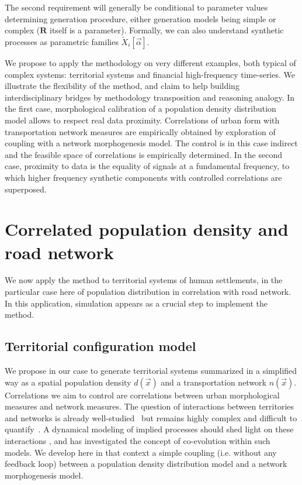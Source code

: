 \documentclass{article}
\begin{document}
The second requirement will generally be conditional to parameter values determining generation procedure, either generation models being simple or complex ($\mathbf{R}$ itself is a parameter). Formally,  we can also understand synthetic processes as parametric families $\tilde{X}_i[\vec{\alpha}]$.

We propose to apply the methodology on very different examples, both typical of complex systems: territorial systems and financial high-frequency time-series. We illustrate the flexibility of the method, and claim to help building interdisciplinary bridges by methodology transposition and reasoning analogy. In the first case, morphological calibration of a population density distribution model allows to respect real data proximity. Correlations of urban form with transportation network measures are empirically obtained by exploration of coupling with a network morphogenesis model. The control is in this case indirect and the feasible space of correlations is empirically determined. In the second case, proximity to data is the equality of signals at a fundamental frequency, to which higher frequency synthetic components with controlled correlations are superposed.





\section*{Correlated population density and road network}

We now apply the method to territorial systems of human settlements, in the particular case here of population distribution in correlation with road network. In this application, simulation appears as a crucial step to implement the method.


\subsection*{Territorial configuration model}

We propose in our case to generate territorial systems summarized in a simplified way as a spatial population density $d(\vec{x})$ and a transportation network $n(\vec{x})$. Correlations we aim to control are correlations between urban morphological measures and network measures. The question of interactions between territories and networks is already well-studied~\cite{offner1996reseaux} but remains highly complex and difficult to quantify~\cite{offner1993effets}. A dynamical modeling of implied processes should shed light on these interactions \cite{bretagnolle:tel-00459720}, and \cite{raimbault2018caracterisation} has investigated the concept of co-evolution within such models. We develop here in that context a simple coupling (i.e. without any feedback loop) between a population density distribution model and a network morphogenesis model.
\end{document}
